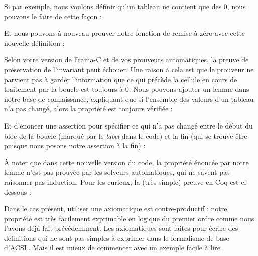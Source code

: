 Si par exemple, nous voulons définir qu'un tableau ne contient que des 0, nous
pouvons le faire de cette façon :






Et nous pouvons à nouveau prouver notre fonction de remise à zéro avec cette
nouvelle définition :






Selon votre version de Frama-C et de vos prouveurs automatiques, la preuve de 
préservation de l'invariant peut échouer. Une raison à cela est que le prouveur ne
parvient pas à garder l'information que ce qui précède la cellule en cours de
traitement par la boucle est toujours à 0. Nous pouvons ajouter un lemme dans
notre base de connaissance, expliquant que si l'ensemble des valeurs d'un tableau
n'a pas changé, alors la propriété est toujours vérifiée :






Et d'énoncer une assertion pour spécifier ce qui n'a pas changé entre le début 
du bloc de la boucle (marqué par le \textit{label}  dans le code) et la fin (qui se
trouve être  puisque nous posons notre assertion à la fin) :






À noter que dans cette nouvelle version du code, la propriété énoncée par notre
lemme n'est pas prouvée par les solveurs automatiques, qui ne savent pas raisonner
pas induction. Pour les curieux, la (très simple) preuve en Coq est ci-dessous :



\begin{Spoiler}
\end{Spoiler}


Dans le cas présent, utiliser une axiomatique est contre-productif : notre
propriété est très facilement exprimable en logique du premier ordre comme
nous l'avons déjà fait précédemment. Les axiomatiques sont faites pour écrire
des définitions qui ne sont pas simples à exprimer dans le formalisme de base
d'ACSL. Mais il est mieux de commencer avec un exemple facile à lire.



